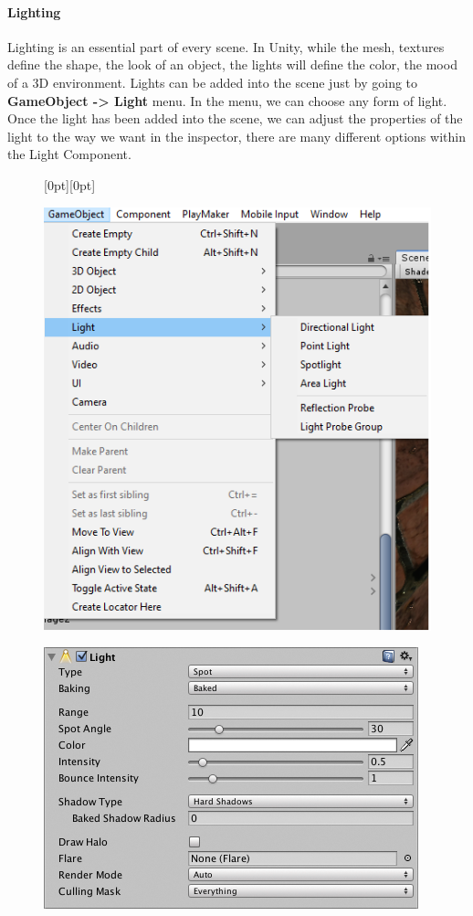 \documentclass[a4paper, 13pt]{extarticle}
\begin{document}
{\paragraph{Lighting}
Lighting is an essential part of every scene. In Unity, while the mesh, textures define the shape, the look of an object, the lights will define the color, the mood of a 3D environment. Lights can be added into the scene just by going to {\bfseries GameObject -> Light} menu. In the menu, we can choose any form of light. Once the light has been added into the scene, we can adjust the properties of the light to the way we want in the inspector, there are many different options within the Light Component. 
\newpage
\begin{figure}[h]
	\centering
	\raisebox{-25mm}[0pt][0pt]{
		\begin{minipage}{.4\textwidth}
			\centering
			\includegraphics[width=0.8\linewidth]{intructions/choose_light.png}
			\centering
			\label{fig:test26}
		\end{minipage}
		\begin{minipage}{.45\textwidth}
			\centering
			\includegraphics[width=1.2\linewidth]{intructions/light_properties.png}

\end{minipage}}
\end{figure}}
\end{document}
